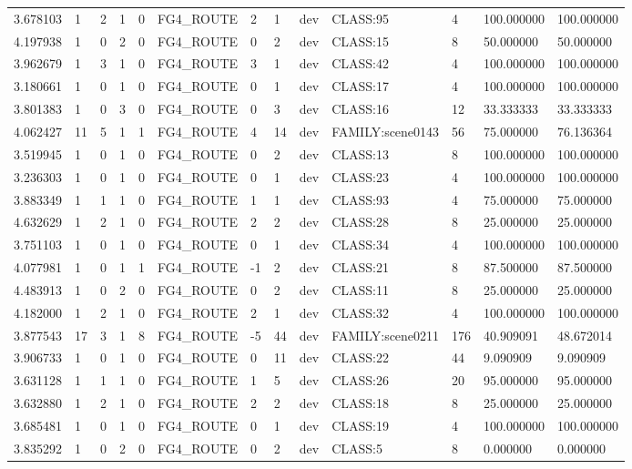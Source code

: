 \begin{tabular}{lllllllllllll}
3.678103 & 1 & 2 & 1 & 0 & FG4\_ROUTE & 2 & 1 & dev & CLASS:95 & 4 & 100.000000 & 100.000000 \\
4.197938 & 1 & 0 & 2 & 0 & FG4\_ROUTE & 0 & 2 & dev & CLASS:15 & 8 & 50.000000 & 50.000000 \\
3.962679 & 1 & 3 & 1 & 0 & FG4\_ROUTE & 3 & 1 & dev & CLASS:42 & 4 & 100.000000 & 100.000000 \\
3.180661 & 1 & 0 & 1 & 0 & FG4\_ROUTE & 0 & 1 & dev & CLASS:17 & 4 & 100.000000 & 100.000000 \\
3.801383 & 1 & 0 & 3 & 0 & FG4\_ROUTE & 0 & 3 & dev & CLASS:16 & 12 & 33.333333 & 33.333333 \\
4.062427 & 11 & 5 & 1 & 1 & FG4\_ROUTE & 4 & 14 & dev & FAMILY:scene0143 & 56 & 75.000000 & 76.136364 \\
3.519945 & 1 & 0 & 1 & 0 & FG4\_ROUTE & 0 & 2 & dev & CLASS:13 & 8 & 100.000000 & 100.000000 \\
3.236303 & 1 & 0 & 1 & 0 & FG4\_ROUTE & 0 & 1 & dev & CLASS:23 & 4 & 100.000000 & 100.000000 \\
3.883349 & 1 & 1 & 1 & 0 & FG4\_ROUTE & 1 & 1 & dev & CLASS:93 & 4 & 75.000000 & 75.000000 \\
4.632629 & 1 & 2 & 1 & 0 & FG4\_ROUTE & 2 & 2 & dev & CLASS:28 & 8 & 25.000000 & 25.000000 \\
3.751103 & 1 & 0 & 1 & 0 & FG4\_ROUTE & 0 & 1 & dev & CLASS:34 & 4 & 100.000000 & 100.000000 \\
4.077981 & 1 & 0 & 1 & 1 & FG4\_ROUTE & -1 & 2 & dev & CLASS:21 & 8 & 87.500000 & 87.500000 \\
4.483913 & 1 & 0 & 2 & 0 & FG4\_ROUTE & 0 & 2 & dev & CLASS:11 & 8 & 25.000000 & 25.000000 \\
4.182000 & 1 & 2 & 1 & 0 & FG4\_ROUTE & 2 & 1 & dev & CLASS:32 & 4 & 100.000000 & 100.000000 \\
3.877543 & 17 & 3 & 1 & 8 & FG4\_ROUTE & -5 & 44 & dev & FAMILY:scene0211 & 176 & 40.909091 & 48.672014 \\
3.906733 & 1 & 0 & 1 & 0 & FG4\_ROUTE & 0 & 11 & dev & CLASS:22 & 44 & 9.090909 & 9.090909 \\
3.631128 & 1 & 1 & 1 & 0 & FG4\_ROUTE & 1 & 5 & dev & CLASS:26 & 20 & 95.000000 & 95.000000 \\
3.632880 & 1 & 2 & 1 & 0 & FG4\_ROUTE & 2 & 2 & dev & CLASS:18 & 8 & 25.000000 & 25.000000 \\
3.685481 & 1 & 0 & 1 & 0 & FG4\_ROUTE & 0 & 1 & dev & CLASS:19 & 4 & 100.000000 & 100.000000 \\
3.835292 & 1 & 0 & 2 & 0 & FG4\_ROUTE & 0 & 2 & dev & CLASS:5 & 8 & 0.000000 & 0.000000 \\

\end{tabular}

